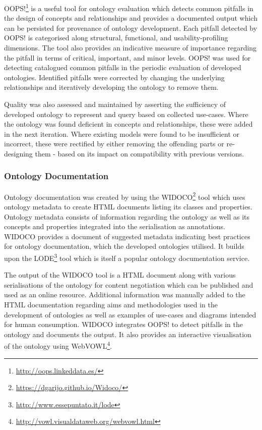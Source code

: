 OOPS!\footnote{\url{http://oops.linkeddata.es/}} \cite{poveda-villalon_oops!_2014} is a useful tool for ontology evaluation which detects common pitfalls in the design of concepts and relationships and provides a documented output which can be persisted for provenance of ontology development. Each pitfall detected by OOPS! is categorised along  structural, functional, and usability-profiling dimensions. The tool also provides an indicative measure of importance regarding the pitfall in terms of critical, important, and minor levels.
OOPS! was used for detecting catalogued common pitfalls in the periodic evaluation of developed ontologies. Identified pitfalls were corrected by changing the underlying relationships and iteratively developing the ontology to remove them. 

Quality was also assessed and maintained by asserting the sufficiency of developed ontology to represent and query based on collected use-cases. Where the ontology was found deficient in concepts and relationships, these were added in the next iteration. Where existing models were found to be insufficient or incorrect, these were rectified by either removing the offending parts or re-designing them - based on its impact on compatibility with previous versions.

\subsubsection*{Ontology Documentation}
Ontology documentation was created by using the WIDOCO\footnote{\url{https://dgarijo.github.io/Widoco/}} \cite{garijo_widoco_2017} tool which uses ontology metadata to create HTML documents listing its classes and properties. Ontology metadata consists of information regarding the ontology as well as its concepts and properties integrated into the serialisation as annotations. WIDOCO provides a document of suggested metadata indicating best practices for ontology documentation, which the developed ontologies utilised. It builds upon the LODE\footnote{\url{http://www.essepuntato.it/lode}} tool which is itself a popular ontology documentation service.

The output of the WIDOCO tool is a HTML document along with various serialisations of the ontology for content negotiation which can be published and used as an online resource. Additional information was manually added to the HTML documentation regarding aims and methodologies used in the development of ontologies as well as examples of use-cases and diagrams intended for human consumption. WIDOCO integrates OOPS! to detect pitfalls in the ontology and documents the output. It also provides an interactive visualisation of the ontology using WebVOWL\footnote{\url{http://vowl.visualdataweb.org/webvowl.html}}.

